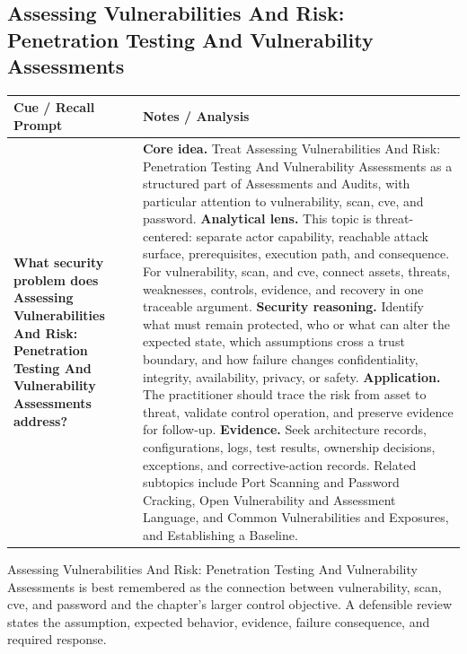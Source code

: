 \documentclass[11pt]{article}
\newcommand{\CornellHeader}{%
\rowcolor{Navy}\color{white}\bfseries Cue / Recall Prompt & \color{white}\bfseries Notes / Analysis\\\hline}
\newcommand{\CornellRow}[2]{%
\cellcolor{CueGray}\RaggedRight\textbf{#1} & \RaggedRight #2\\\hline}
\begin{document}
\subsection*{Assessing Vulnerabilities And Risk: Penetration Testing And Vulnerability Assessments}
\begin{longtable}{>{\RaggedRight\arraybackslash}p{}|>{\RaggedRight\arraybackslash}p{}}
\CornellHeader
\CornellRow{What security problem does Assessing Vulnerabilities And Risk: Penetration Testing And Vulnerability Assessments address?}{\textbf{Core idea.} Treat Assessing Vulnerabilities And Risk: Penetration Testing And Vulnerability Assessments as a structured part of Assessments and Audits, with particular attention to vulnerability, scan, cve, and password. \textbf{Analytical lens.} This topic is threat-centered: separate actor capability, reachable attack surface, prerequisites, execution path, and consequence. For vulnerability, scan, and cve, connect assets, threats, weaknesses, controls, evidence, and recovery in one traceable argument. \textbf{Security reasoning.} Identify what must remain protected, who or what can alter the expected state, which assumptions cross a trust boundary, and how failure changes confidentiality, integrity, availability, privacy, or safety. \textbf{Application.} The practitioner should trace the risk from asset to threat, validate control operation, and preserve evidence for follow-up. \textbf{Evidence.} Seek architecture records, configurations, logs, test results, ownership decisions, exceptions, and corrective-action records. Related subtopics include Port Scanning and Password Cracking, Open Vulnerability and Assessment Language, and Common Vulnerabilities and Exposures, and Establishing a Baseline.}
\end{longtable}
\begin{topicsummary}
Assessing Vulnerabilities And Risk: Penetration Testing And Vulnerability Assessments is best remembered as the connection between vulnerability, scan, cve, and password and the chapter's larger control objective. A defensible review states the assumption, expected behavior, evidence, failure consequence, and required response.
\end{topicsummary}
\end{document}

